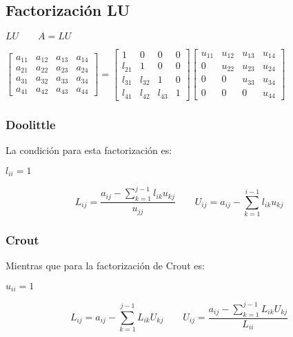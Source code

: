 \subsection{Factorizaci\'on LU}
\begin{center} $LU \qquad A=LU$ \end{center}
\begin{center} $\begin{bmatrix}
			      a_{11} & a_{12} & a_{13} & a_{14}\\
			      a_{21} & a_{22} & a_{23} & a_{24}\\
			      a_{31} & a_{32} & a_{33} & a_{34}\\
			      a_{41} & a_{42} & a_{43} & a_{44}
			      
\end{bmatrix}= \begin{bmatrix}
			       1 & 0 & 0 & 0\\
			      l_{21} & 1 & 0 & 0\\
			      l_{31} & l_{32} & 1 & 0\\
			      l_{41} & l_{42} & l_{43} & 1
\end{bmatrix} \begin{bmatrix}
                  u_{11} & u_{12} & u_{13} & u_{14}\\
			      0 & u_{22} & u_{23} & u_{24}\\
			      0 & 0 & u_{33} & u_{34}\\
			      0 & 0 & 0 & u_{44}
\end{bmatrix} $
\end{center}
\subsubsection{Doolittle}
La condici\'on para esta factorizaci\'on es:
\begin{center}
$l_{ii}=1$
\end{center}
\begin{displaymath}
L_{ij}=\frac{a_{ij}-\sum_{k=1}^{j-1}l_{ik}u_{kj}}{u_{jj}} \qquad U_{ij}=a_{ij}-\sum_{k=1}^{i-1}l_{ik}u_{kj}
\end{displaymath}
\subsubsection{Crout}
Mientras que para la factorizaci\'on de Crout es:
\begin{center}
$u_{ii}=1$
\end{center} 
\begin{displaymath}
L_{ij}=a_{ij}-\sum_{k=1}^{j-1}L_{ik}U_{kj} \qquad U_{ij}=\frac{a_{ij}-\sum_{k=1}^{j-1}L_{ik}U_{kj}}{L_{ii}}
\end{displaymath}
